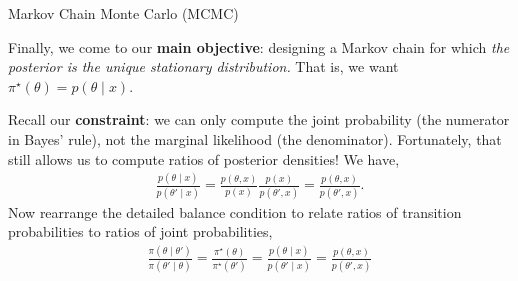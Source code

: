 \documentclass[aspectratio=169]{beamer}
\begin{document}
\begin{frame}[t,allowframebreaks]{Markov Chain Monte Carlo
(MCMC)}\label{markov-chain-monte-carlo-mcmc}

Finally, we come to our \textbf{main objective}: designing a Markov
chain for which \emph{the posterior is the unique stationary
distribution.} That is, we want
\(\pi^\star(\theta) = p(\theta \mid x)\).

Recall our \textbf{constraint}: we can only compute the joint
probability (the numerator in Bayes' rule), not the marginal likelihood
(the denominator). Fortunately, that still allows us to compute ratios
of posterior densities! We have, \begin{align*}
\frac{p(\theta \mid x)}{p(\theta' \mid x)} = \frac{p(\theta, x)}{p(x)} \frac{p(x)}{p(\theta', x)} = \frac{p(\theta, x)}{p(\theta', x)}.
\end{align*} Now rearrange the detailed balance condition to relate
ratios of transition probabilities to ratios of joint probabilities,
\begin{align*}
\frac{\pi(\theta \mid \theta')}{\pi(\theta' \mid \theta)} = \frac{\pi^\star(\theta)}{\pi^\star(\theta')} 
= \frac{p(\theta \mid x)}{p(\theta' \mid x)} = \frac{p(\theta, x)}{p(\theta', x)}
\end{align*}

\end{frame}
\end{document}
